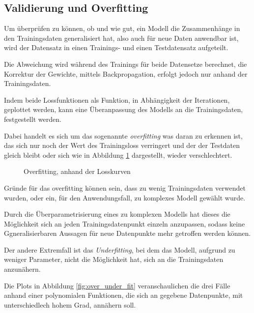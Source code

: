 \subsection{Validierung und Overfitting}\label{subsec:validation}

Um überprüfen zu können, ob und wie gut, ein Modell die Zusammenhänge
in den Trainingsdaten generalisiert hat, also auch für neue Daten
anwendbar ist, wird der Datensatz in einen Trainings- und
einen Testdatensatz aufgeteilt.

Die Abweichung wird während des Trainings für beide Datensetze 
berechnet, die Korrektur der Gewichte, mittels Backpropagation,
erfolgt jedoch nur anhand der Trainingsdaten.

Indem beide Lossfunktionen als Funktion, in Abhängigkeit 
der Iterationen, geplottet werden, kann eine Überanpassung
des Modells an die Trainingsdaten, festgestellt werden.

Dabei handelt es sich um das sogenannte \textit{\Gls{overfitting}}
was daran zu erkennen ist, das sich nur noch der Wert des 
Trainingsloss verringert und der der Testdaten 
gleich bleibt oder sich wie in Abbildung \ref{fig:overfitting}
dargestellt, wieder verschlechtert.
\vspace{1cm}

\begin{figure}[H]
    \centering
    \def\svgwidth{0.5\textwidth}
    
    \caption{Overfitting, anhand der Losskurven}
    \label{fig:overfitting}
\end{figure}
\vspace{1cm}

Gründe für das \Gls{overfitting} können sein,
dass zu wenig Trainingsdaten
verwendet wurden, oder ein, für den Anwendungsfall, 
zu komplexes Modell gewählt wurde.

Durch die Überparametrisierung eines zu komplexen Modells hat 
dieses die Möglichkeit sich an jeden Trainingsdatenpunkt einzeln
anzupassen, sodass keine Ggneralisierbaren 
Aussagen für neue Datenpunkte mehr getroffen werden können.

Der andere Extremfall ist das \textit{Underfitting}, 
bei dem das Modell, aufgrund zu weniger Parameter, nicht die 
Möglichkeit hat, sich an die Trainingsdaten anzunähern.

Die Plots in Abbildung \ref{fig:over_under_fit} veranschaulichen 
die drei Fälle anhand einer polynomialen Funktionen,
die sich an gegebene Datenpunkte, mit unterschiedlech hohem 
Grad, annähern soll.

